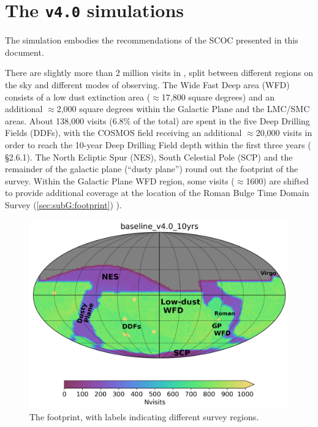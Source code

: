 \section{The \texttt{v4.0} simulations} \label{sec:baseline4_0}

The  simulation embodies the recommendations of the SCOC presented in this document. 

There are slightly more than 2 million visits in , split between different regions on the sky and different modes of observing. The Wide Fast Deep area (WFD) consists of a low dust extinction area ($\approx$17,800 square degrees) and an additional $\approx$2,000 square degrees within the Galactic Plane and the LMC/SMC areas. About 138,000 visits (6.8\% of the total) are spent in the five Deep Drilling Fields (DDFs), with the COSMOS field receiving an additional $\approx$20,000 visits in order to reach the 10-year Deep Drilling Field depth within the first three years ( \S2.6.1). The North Ecliptic Spur (NES), South Celestial Pole (SCP) and the remainder of the galactic plane (``dusty plane'') round out the footprint of the survey. Within the Galactic Plane WFD region, some visits ($\approx$1600) are shifted to provide additional coverage at the location of the Roman Bulge Time Domain Survey (\autoref{sec:subG:footprint})
). 

\begin{figure}
  \centering
    \includegraphics[width=0.7\linewidth]{figures/baseline_v4_0_10yrs_nvisits.png}
    \caption{The  footprint, with labels indicating different survey regions.}
    \label{fig:footprint_v4}
\end{figure}

